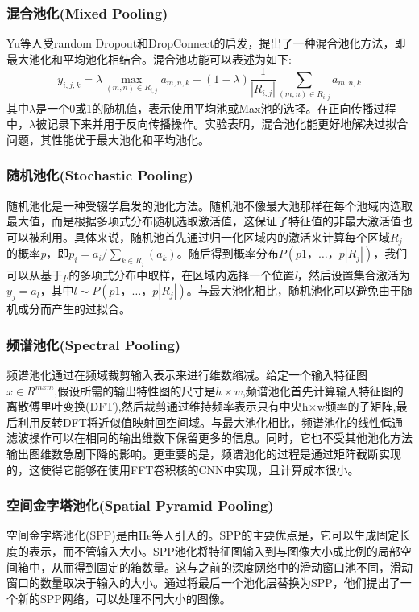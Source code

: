 \documentclass[final]{cvpr}
\begin{document}
\subsubsection{混合池化(Mixed Pooling)}
Yu等人受random Dropout和DropConnect的启发，提出了一种混合池化方法，即最大池化和平均池化相结合。混合池功能可以表述为如下:
\begin{equation}
	y_{i,j,k}=\lambda\max_{(m,n)\in R_{i,j}}a_{m,n,k}+(1-\lambda)\frac{1}{|R_{i,j}|}\sum_{(m,n)\in R_{i,j}}a_{m,n,k}
\end{equation}
其中$\lambda$是一个0或1的随机值，表示使用平均池或Max池的选择。在正向传播过程中，$\lambda$被记录下来并用于反向传播操作。实验表明，混合池化能更好地解决过拟合问题，其性能优于最大池化和平均池化。
\subsubsection{随机池化(Stochastic Pooling)}
随机池化是一种受辍学启发的池化方法。随机池不像最大池那样在每个池域内选取最大值，而是根据多项式分布随机选取激活值，这保证了特征值的非最大激活值也可以被利用。具体来说，随机池首先通过归一化区域内的激活来计算每个区域$R_j$的概率\emph{p}，即$p_i=a_i/\sum_{k\in R_j}(a_k)$。随后得到概率分布$P(p1，…，p|R_j|)$，我们可以从基于\emph{p}的多项式分布中取样，在区域内选择一个位置\emph{l}，然后设置集合激活为$y_j=a_l$，其中$\textit{l}\sim P(p1，…，p|R_j|)$。与最大池化相比，随机池化可以避免由于随机成分而产生的过拟合。
\subsubsection{频谱池化(Spectral Pooling)}
频谱池化通过在频域裁剪输入表示来进行维数缩减。给定一个输入特征图$x\in R^{mxm}$,假设所需的输出特性图的尺寸是$h×w$,频谱池化首先计算输入特征图的离散傅里叶变换(DFT),然后裁剪通过维持频率表示只有中央h×w频率的子矩阵,最后利用反转DFT将近似值映射回空间域。与最大池化相比，频谱池化的线性低通滤波操作可以在相同的输出维数下保留更多的信息。同时，它也不受其他池化方法输出图维数急剧下降的影响。更重要的是，频谱池化的过程是通过矩阵截断实现的，这使得它能够在使用FFT卷积核的CNN中实现，且计算成本很小。
\subsubsection{空间金字塔池化(Spatial Pyramid Pooling)}
空间金字塔池化(SPP)是由He等人引入的。SPP的主要优点是，它可以生成固定长度的表示，而不管输入大小。SPP池化将特征图输入到与图像大小成比例的局部空间箱中，从而得到固定的箱数量。这与之前的深度网络中的滑动窗口池不同，滑动窗口的数量取决于输入的大小。通过将最后一个池化层替换为SPP，他们提出了一个新的SPP网络，可以处理不同大小的图像。
\end{document}
